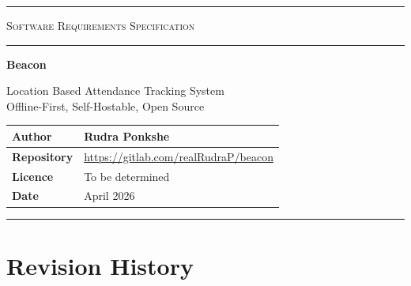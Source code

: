 \documentclass[12pt, a4paper]{article}
\begin{document}
\begin{titlepage}
    \centering
    \thispagestyle{empty}

    \noindent\rule{\linewidth}{1.5pt}
    \vspace{0.5em}

    {\large\scshape Software Requirements Specification}

    \vspace{0.3em}
    \noindent\rule{\linewidth}{0.5pt}
    \vspace{2em}

    {\Huge\bfseries Beacon}

    \vspace{0.5em}
    {\large Location Based Attendance Tracking System}\\[4pt]
    {\normalsize Offline-First, Self-Hostable, Open Source}

    \vspace{2em}


    \vfill

    \begin{tabularx}{0.85\linewidth}{@{} l X @{}}
        \toprule
        \textbf{Author}       & Rudra Ponkshe \\
        \midrule
        \textbf{Repository}   & \url{https://gitlab.com/realRudraP/beacon} \\
        \midrule
        \textbf{Licence}      & To be determined \\
        \midrule
        \textbf{Date}         & April 2026 \\
        \bottomrule
    \end{tabularx}

    \vspace{2em}
    \noindent\rule{\linewidth}{1.5pt}
\end{titlepage}

\newpage
\thispagestyle{fancy}
\section*{Revision History}
\end{document}
